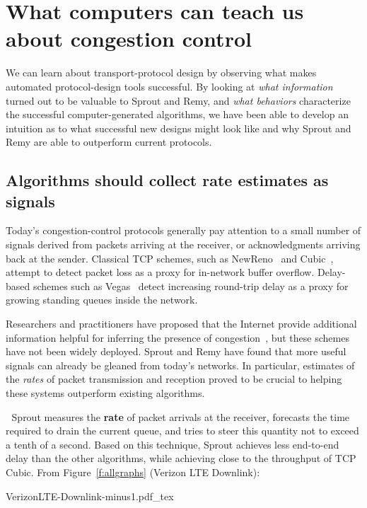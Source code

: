 \section{What computers can teach us about congestion control}

We can learn about transport-protocol design by observing what makes
automated protocol-design tools successful. By looking at \emph{what
  information} turned out to be valuable to Sprout and Remy, and
\emph{what behaviors} characterize the successful computer-generated
algorithms, we have been able to develop an intuition as to what
successful new designs might look like and why Sprout and Remy are
able to outperform current protocols.

\subsection{Algorithms should collect rate estimates as signals}

Today's congestion-control protocols generally pay attention to a
small number of signals derived from packets arriving at the receiver,
or acknowledgments arriving back at the sender. Classical TCP schemes,
such as NewReno~\cite{newreno} and Cubic~\cite{cubic}, attempt to
detect packet loss as a proxy for in-network buffer
overflow. Delay-based schemes such as Vegas~\cite{vegas} detect
increasing round-trip delay as a proxy for growing standing queues
inside the network.

Researchers and practitioners have proposed that the Internet provide
additional information helpful for inferring the presence of
congestion~\cite{ecn,xcp,rcp,vcp}, but these schemes have not been
widely deployed. Sprout and Remy have found that more useful signals
can already be gleaned from today's networks. In particular, estimates
of the \emph{rates} of packet transmission and reception proved to be
crucial to helping these systems outperform existing algorithms.

\noindent \begin{minipage}{\textwidth}

\textcolor{white}{.}\hspace{\parindent} Sprout measures the \textbf{rate} of packet arrivals at the receiver,
forecasts the time required to drain the current queue, and tries to
steer this quantity not to exceed a tenth of a second. Based on this
technique, Sprout achieves less end-to-end delay than the other
algorithms, while achieving close to the throughput of TCP
Cubic. From Figure~\ref{f:allgraphs} (Verizon LTE Downlink):

\vspace{\baselineskip}

\def\svgwidth{\textwidth}\footnotesize{VerizonLTE-Downlink-minus1.pdf_tex}
\end{minipage}

